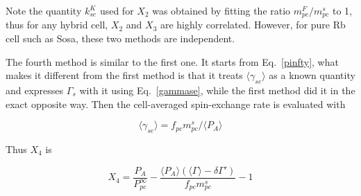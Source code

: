 Note the quantity $k_{se}^K$ used for $X_2$ was obtained by fitting the ratio $m_{pc}^F/m_{pc}^s$ to 1, thus for any hybrid cell, $X_2$ and $X_3$ are highly correlated. However, for pure Rb cell such as Sosa, these two methods are independent.

The fourth method is similar to the first one. It starts from Eq.~\ref{pinfty}, what makes it different from the first method is that it treats $\langle\gamma_{se}\rangle$ as a known quantity and expresses $\Gamma_s$ with it using Eq.~\ref{gammase}, while the first method did it in the exact opposite way. Then the cell-averaged spin-exchange rate is evaluated with 

\begin{equation}
\langle\gamma_{se}\rangle=f_{pc}m_{pc}^s/\langle P_A\rangle
\end{equation}

Thus $X_4$ is

\begin{equation}
X_4=\frac{P_A}{P_{pc}^\infty}-\frac{\langle P_A\rangle(\langle\Gamma\rangle-\delta\Gamma')}{f_{pc}m_{pc}^s}-1
\end{equation}

